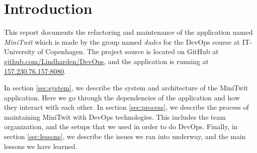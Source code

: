\section{Introduction}

This report documents the refactoring and maintenance of the application named \textit{MiniTwit} which is made by the group named \textit{dudes} for the DevOps course at IT-University of Copenhagen. The project source is located on GitHub at \href{https://github.com/Lindharden/DevOps}{github.com/Lindharden/DevOps}, and the application is running at \href{http://157.230.76.157:8080}{157.230.76.157:8080}.

In section \ref{sec:system}, we describe the system and architecture of the MiniTwit application. Here we go through the dependencies of the application and how they interact with each other. In section \ref{sec:process}, we describe the process of maintaining MiniTwit with DevOps technologies. This includes the team organization, and the setups that we used in order to do DevOps. Finally, in section \ref{sec:lessons}, we describe the issues we ran into underway, and the main lessons we have learned.
